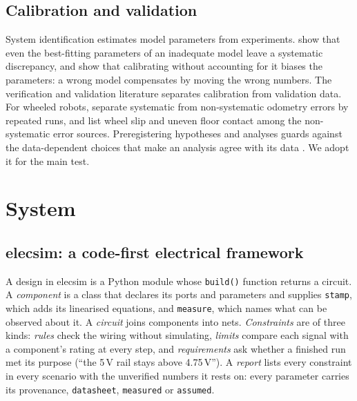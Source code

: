 \documentclass[conference,a4paper]{IEEEtran}
\newcommand{\code}[1]{\texttt{\small #1}}
\begin{document}
\subsection{Calibration and validation}
System identification \citep{ljung1999system} estimates model parameters from
experiments. \citet{kennedy2001bayesian} show that even the best-fitting
parameters of an inadequate model leave a systematic discrepancy, and
\citet{brynjarsdottir2014learning} show that calibrating without accounting
for it biases the parameters: a wrong model compensates by moving the wrong
numbers. The verification and validation literature
\citep{oberkampf2010verification,sargent2013verification} separates
calibration from validation data. For wheeled robots,
\citet{borenstein1996measurement} separate systematic from non-systematic
odometry errors by repeated runs, and \citet{siegwart2011introduction} list
wheel slip and uneven floor contact among the non-systematic error sources. Preregistering hypotheses
and analyses \citep{nosek2018preregistration} guards against the data-dependent
choices that make an analysis agree with its data
\citep{gelman2014statistical}. We adopt it for the main test.

\section{System}\label{sec:system}

\subsection{elecsim: a code-first electrical framework}
A design in elecsim is a Python module whose \code{build()} function returns a
circuit. A \emph{component} is a class that declares its ports and parameters
and supplies \code{stamp}, which adds its linearised equations, and
\code{measure}, which names what can be observed about it. A \emph{circuit}
joins components into nets. \emph{Constraints} are of three kinds:
\emph{rules} check the wiring without simulating, \emph{limits} compare each
signal with a component's rating at every step, and \emph{requirements} ask
whether a finished run met its purpose (``the 5\,V rail stays above
4.75\,V''). A \emph{report} lists every constraint in every scenario with the
unverified numbers it rests on: every parameter carries its provenance,
\code{datasheet}, \code{measured} or \code{assumed}.
\end{document}
